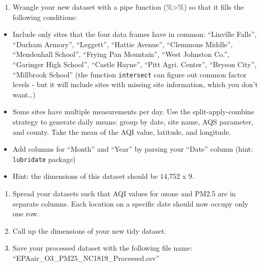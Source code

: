 \documentclass[
]{article}
\providecommand{\tightlist}{%
  \setlength{\itemsep}{0pt}\setlength{\parskip}{0pt}}
\begin{document}
\begin{enumerate}
\def\labelenumi{\arabic{enumi}.}
\setcounter{enumi}{7}
\tightlist
\item
  Wrangle your new dataset with a pipe function (\%\textgreater\%) so
  that it fills the following conditions:
\end{enumerate}

\begin{itemize}
\item
  Include only sites that the four data frames have in common:
  ``Linville Falls'', ``Durham Armory'', ``Leggett'', ``Hattie Avenue'',
  ``Clemmons Middle'', ``Mendenhall School'', ``Frying Pan Mountain'',
  ``West Johnston Co.'', ``Garinger High School'', ``Castle Hayne'',
  ``Pitt Agri. Center'', ``Bryson City'', ``Millbrook School'' (the
  function \texttt{intersect} can figure out common factor levels - but
  it will include sites with missing site information, which you don't
  want\ldots)
\item
  Some sites have multiple measurements per day. Use the
  split-apply-combine strategy to generate daily means: group by date,
  site name, AQS parameter, and county. Take the mean of the AQI value,
  latitude, and longitude.
\item
  Add columns for ``Month'' and ``Year'' by parsing your ``Date'' column
  (hint: \texttt{lubridate} package)
\item
  Hint: the dimensions of this dataset should be 14,752 x 9.
\end{itemize}

\begin{enumerate}
\def\labelenumi{\arabic{enumi}.}
\setcounter{enumi}{8}
\item
  Spread your datasets such that AQI values for ozone and PM2.5 are in
  separate columns. Each location on a specific date should now occupy
  only one row.
\item
  Call up the dimensions of your new tidy dataset.
\item
  Save your processed dataset with the following file name:
  ``EPAair\_O3\_PM25\_NC1819\_Processed.csv''
\end{enumerate}
\end{document}
